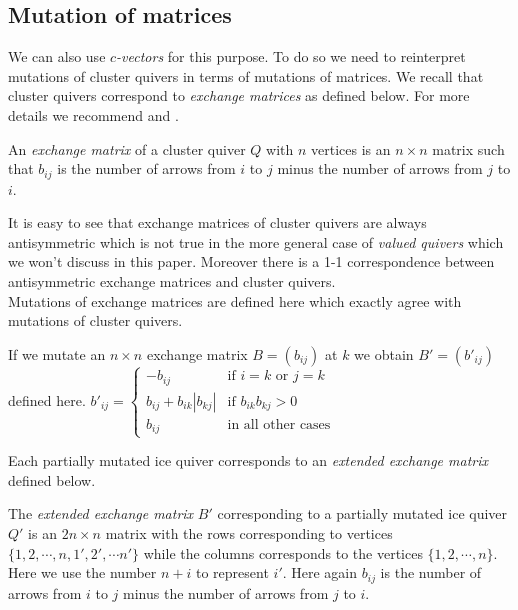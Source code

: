 \subsection{Mutation of matrices}
\indent We can also use $c$\textit{-vectors} for this purpose. To do so we need to reinterpret mutations of cluster quivers in terms of mutations of matrices. We recall that cluster quivers correspond to \textit{exchange matrices} as defined below. For more details we recommend \cite{FZ01} and \cite{FZ06}.\\
\begin{definition}
\cite{FZ01} An \textit{exchange matrix} of a cluster quiver $Q$ with $n$ vertices is an $n\times n$ matrix such that $b_{ij}$ is the number of arrows from $i$ to $j$ minus the number of arrows from $j$ to $i$.
\end{definition}
\indent It is easy to see that exchange matrices of cluster quivers are always antisymmetric which is not true in the more general case of \textit{valued quivers} which we won't discuss in this paper. Moreover there is a 1-1 correspondence between antisymmetric exchange matrices and cluster quivers.\\
\indent Mutations of exchange matrices are defined here which exactly agree with mutations of cluster quivers.\\
\begin{definition}
\cite{FZ01} If we mutate an $n\times n$ exchange matrix $B = (b_{ij})$ at $k$ we obtain $B' = (b'_{ij})$ defined here.
$b'_{ij} = \begin{cases}
-b_{ij} & \text{if }i = k\text{ or }j = k\\
b_{ij} + b_{ik}|b_{kj}| & \text{if }b_{ik}b_{kj} > 0\\
b_{ij} & \text{in all other cases}
\end{cases}$
\end{definition}
\indent Each partially mutated ice quiver corresponds to an \textit{extended exchange matrix} defined below.\\
\begin{definition}
The \textit{extended exchange matrix} $B'$ corresponding to a partially mutated ice quiver $Q'$ is an $2n\times n$ matrix with the rows corresponding to vertices $\{1,2,\cdots, n, 1', 2',\cdots n'\}$ while the columns corresponds to the vertices $\{1,2,\cdots, n\}$. Here we use the number $n+i$ to represent $i'$. Here again $b_{ij}$ is the number of arrows from $i$ to $j$ minus the number of arrows from $j$ to $i$.
\end{definition}
